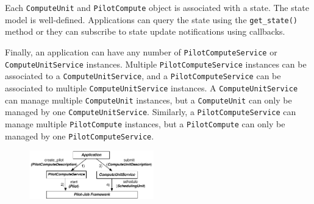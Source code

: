 \documentclass[conference]{IEEEtran}
\begin{document}
Each \texttt{Compute\-Unit} and \texttt{Pilot\-Compute} object is associated
with a state.
The state model is well-defined.
Applications can query the state using the \texttt{get\_state()} method or 
they can subscribe to state update notifications using callbacks.

Finally, an application can have any number of \texttt{Pilot\-Compute\-Service} or
\texttt{Compute\-Unit\-Service} instances.
Multiple \texttt{Pilot\-Compute\-Service} instances can be associated to a
\texttt{Compute\-Unit\-Service}, and a \texttt{Pilot\-Compute\-Service} can be associated to
multiple \texttt{Compute\-Unit\-Service} instances.
A \texttt{Compute\-Unit\-Service} can manage multiple \texttt{Compute\-Unit}
instances, but a \texttt{Compute\-Unit} can only be managed by one
\texttt{Compute\-Unit\-Service}.
Similarly, a \texttt{Pilot\-Compute\-Service} can manage multiple
\texttt{Pilot\-Compute} instances, but a \texttt{Pilot\-Compute} can only be
managed by one \texttt{Pilot\-Compute\-Service}.


\begin{figure}[t]
	\centering
  \upp\up
		\includegraphics[width=0.48\textwidth]{../figures/pilot-api-flow.pdf}
	\caption{}
	\label{fig:figures_pilot_api_flow}
\end{figure}

\end{document}
